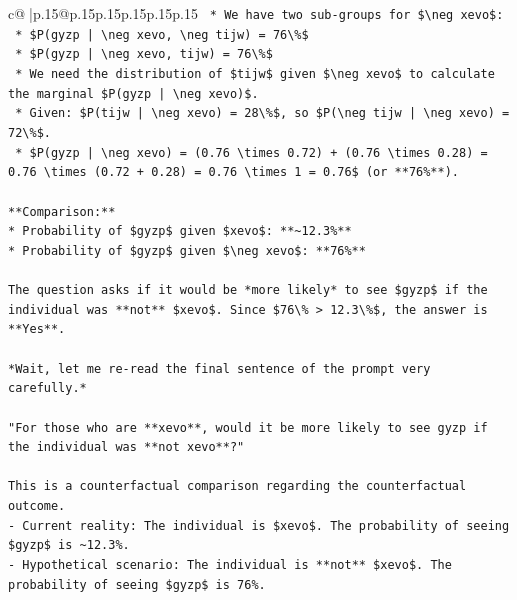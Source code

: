 \documentclass{article}
\begin{document}
{\begin{supertabular}{c@{$\;$}|p{.15\linewidth}@{}p{.15\linewidth}p{.15\linewidth}p{.15\linewidth}p{.15\linewidth}p{.15\linewidth}}
{{{\texttt{    *   We have two sub{-}groups for \$\textbackslash{}neg xevo\$:} \\
\texttt{        *   \$P(gyzp | \textbackslash{}neg xevo, \textbackslash{}neg tijw) = 76\textbackslash{}\%\$} \\
\texttt{        *   \$P(gyzp | \textbackslash{}neg xevo, tijw) = 76\textbackslash{}\%\$} \\
\texttt{    *   We need the distribution of \$tijw\$ given \$\textbackslash{}neg xevo\$ to calculate the marginal \$P(gyzp | \textbackslash{}neg xevo)\$.} \\
\texttt{    *   Given: \$P(tijw | \textbackslash{}neg xevo) = 28\textbackslash{}\%\$, so \$P(\textbackslash{}neg tijw | \textbackslash{}neg xevo) = 72\textbackslash{}\%\$.} \\
\texttt{    *   \$P(gyzp | \textbackslash{}neg xevo) = (0.76 \textbackslash{}times 0.72) + (0.76 \textbackslash{}times 0.28) = 0.76 \textbackslash{}times (0.72 + 0.28) = 0.76 \textbackslash{}times 1 = 0.76\$ (or **76\%**).} \\
\\ 
\texttt{**Comparison:**} \\
\texttt{*   Probability of \$gyzp\$ given \$xevo\$: **\textasciitilde{}12.3\%**} \\
\texttt{*   Probability of \$gyzp\$ given \$\textbackslash{}neg xevo\$: **76\%**} \\
\\ 
\texttt{The question asks if it would be *more likely* to see \$gyzp\$ if the individual was **not** \$xevo\$. Since \$76\textbackslash{}\% > 12.3\textbackslash{}\%\$, the answer is **Yes**.} \\
\\ 
\texttt{*Wait, let me re{-}read the final sentence of the prompt very carefully.*} \\
\\ 
\texttt{"For those who are **xevo**, would it be more likely to see gyzp if the individual was **not xevo**?"} \\
\\ 
\texttt{This is a counterfactual comparison regarding the counterfactual outcome.} \\
\texttt{{-} Current reality: The individual is \$xevo\$. The probability of seeing \$gyzp\$ is \textasciitilde{}12.3\%.} \\
\texttt{{-} Hypothetical scenario: The individual is **not** \$xevo\$. The probability of seeing \$gyzp\$ is 76\%.} \\
\\ 
}}}
\end{supertabular}}
\end{document}
